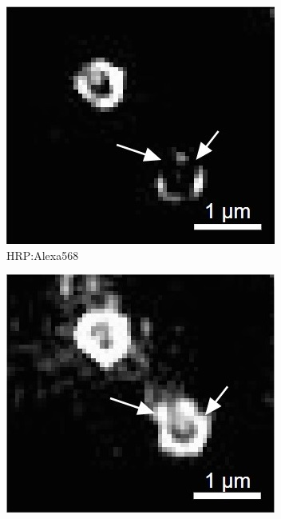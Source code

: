 \begin{figure}
	\hspace{-0.1cm}
	\begin{subfigure}[t]{0.24\textwidth}
		\centering
		\includegraphics[width=\linewidth]{images/DeepSIM_NMJ_woAO_ROI2_Alexa568.jpg}
		\caption{HRP:Alexa568}
		\label{fig:DeepSIM_NMJ_woAO_ROI2_Alexa568}
	\end{subfigure}
	\hspace{0.05cm}
	\begin{subfigure}[t]{0.24\textwidth}
		\centering
		\includegraphics[width=\linewidth]{images/DeepSIM_NMJ_AO_ROI2_Alexa568.jpg}

\end{subfigure}
\end{figure}
